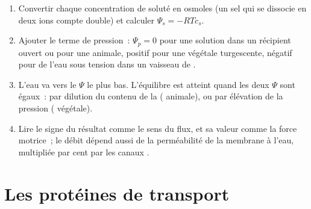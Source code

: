 \begin{method}\label{met:b1:membranes-transport:psi}
\begin{enumerate}
  \item Convertir chaque concentration de soluté en osmoles (un sel qui
        se dissocie en deux ions compte double) et calculer $\Psi_s =
        -RTc_s$.
  \item Ajouter le terme de pression~: $\Psi_p = 0$ pour une solution
        dans un récipient ouvert ou pour une  animale, positif
        pour une  végétale turgescente, négatif pour de l'eau
        sous tension dans un vaisseau de .
  \item L'eau va vers le $\Psi$ le plus bas. L'équilibre est atteint
        quand les deux $\Psi$ sont égaux~: par dilution du contenu de la
         ( animale), ou par élévation de la pression
        ( végétale).
  \item Lire le signe du résultat comme le sens du flux, et sa valeur
        comme la force motrice~; le débit dépend aussi de la
        perméabilité de la membrane à l'eau, multipliée par cent par les
        canaux .
\end{enumerate}
\end{method}

\section{Les protéines de transport}

